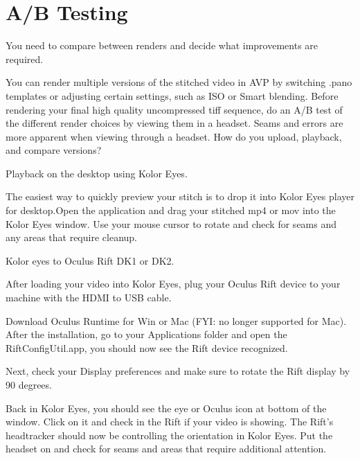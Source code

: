 \chapter{A/B Testing}
\pagecolor{white}
\label{chap:46}
\begin{fullwidth}

\problem

{\large You need to compare between renders and decide what improvements are required. \par}

You can render multiple versions of the stitched video in AVP by switching .pano templates or adjusting certain settings, such as ISO or Smart blending. Before rendering your final high quality uncompressed tiff sequence, do an A/B test of the different render choices by viewing them in a headset. Seams and errors are more apparent when viewing through a headset. How do you upload, playback, and compare versions?

\solutions

{\large Playback on the desktop using Kolor Eyes. \par}


The easiest way to quickly preview your stitch is to drop it into Kolor Eyes player for desktop.Open the application and drag your stitched mp4 or mov into the Kolor Eyes window. Use your mouse cursor to rotate and check for seams and any areas that require cleanup.  

{\large Kolor eyes to Oculus Rift DK1 or DK2. \par}

After loading your video into Kolor Eyes, plug your Oculus Rift device to your machine with the HDMI to USB cable.

Download Oculus Runtime for Win or Mac (FYI: no longer supported for Mac). After the installation, go to your Applications folder and open the RiftConfigUtil.app, you should now see the Rift device recognized.


Next, check your Display preferences and make sure to rotate the Rift display by 90 degrees.


Back in Kolor Eyes, you should see the eye or Oculus icon at bottom of the window. Click on it and check in the Rift if your video is showing. The Rift’s headtracker should now be controlling the orientation in Kolor Eyes. Put the headset on and check for seams and areas that require additional attention.


\end{fullwidth}
